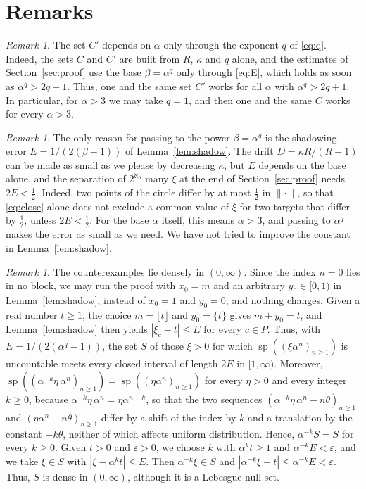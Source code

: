 \documentclass[11pt,reqno]{amsart}
\theoremstyle{definition}
\theoremstyle{remark}
\newtheorem{remark}[theorem]{Remark}
\numberwithin{equation}{section}
\DeclareMathOperator{\spec}{sp}
\begin{document}
\section{Remarks}

\begin{remark}\label{rem:uniform}
The set $C'$ depends on $\alpha$ only through the exponent $q$ of \eqref{eq:q}. Indeed, the sets $C$ and $C'$ are built from $R$, $\kappa$ and $q$ alone, and the estimates of Section~\ref{sec:proof} use the base $\beta=\alpha^q$ only through \eqref{eq:E}, which holds as soon as $\alpha^q>2q+1$. Thus, one and the same set $C'$ works for all $\alpha$ with $\alpha^q>2q+1$. In particular, for $\alpha>3$ we may take $q=1$, and then one and the same $C$ works for every $\alpha>3$.
\end{remark}

\begin{remark}\label{rem:range}
The only reason for passing to the power $\beta=\alpha^q$ is the shadowing error $E=1/(2(\beta-1))$ of Lemma~\ref{lem:shadow}. The drift $D=\kappa R/(R-1)$ can be made as small as we please by decreasing $\kappa$, but $E$ depends on the base alone, and the separation of $2^{\aleph_0}$ many $\xi$ at the end of Section~\ref{sec:proof} needs $2E<\tfrac12$. Indeed, two points of the circle differ by at most $\tfrac12$ in $\|\cdot\|$, so that \eqref{eq:close} alone does not exclude a common value of $\xi$ for two targets that differ by $\tfrac12$, unless $2E<\tfrac12$. For the base $\alpha$ itself, this means $\alpha>3$, and passing to $\alpha^q$ makes the error as small as we need. We have not tried to improve the constant in Lemma~\ref{lem:shadow}.
\end{remark}

\begin{remark}
The counterexamples lie densely in $(0,\infty)$. Since the index $n=0$ lies in no block, we may run the proof with $x_0=m$ and an arbitrary $y_0\in[0,1)$ in Lemma~\ref{lem:shadow}, instead of $x_0=1$ and $y_0=0$, and nothing changes. Given a real number $t\ge1$, the choice $m=\lfloor t\rfloor$ and $y_0=\{t\}$ gives $m+y_0=t$, and Lemma~\ref{lem:shadow} then yields $|\xi_c-t|\le E$ for every $c\in P$. Thus, with $E=1/(2(\alpha^q-1))$, the set $S$ of those $\xi>0$ for which $\spec((\xi\alpha^n)_{n\ge1})$ is uncountable meets every closed interval of length $2E$ in $[1,\infty)$. Moreover, $\spec((\alpha^{-k}\eta\,\alpha^n)_{n\ge1})=\spec((\eta\alpha^n)_{n\ge1})$ for every $\eta>0$ and every integer $k\ge0$, because $\alpha^{-k}\eta\,\alpha^n=\eta\alpha^{n-k}$, so that the two sequences $(\alpha^{-k}\eta\,\alpha^n-n\theta)_{n\ge1}$ and $(\eta\alpha^n-n\theta)_{n\ge1}$ differ by a shift of the index by $k$ and a translation by the constant $-k\theta$, neither of which affects uniform distribution. Hence, $\alpha^{-k}S=S$ for every $k\ge0$. Given $t>0$ and $\varepsilon>0$, we choose $k$ with $\alpha^kt\ge1$ and $\alpha^{-k}E<\varepsilon$, and we take $\xi\in S$ with $|\xi-\alpha^kt|\le E$. Then $\alpha^{-k}\xi\in S$ and $|\alpha^{-k}\xi-t|\le\alpha^{-k}E<\varepsilon$. Thus, $S$ is dense in $(0,\infty)$, although it is a Lebesgue null set.
\end{remark}
\end{document}
